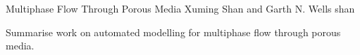              {Multiphase Flow Through Porous Media}
              {Xuming Shan and Garth N. Wells}
              {shan}

Summarise work on automated modelling for multiphase flow through porous media.
